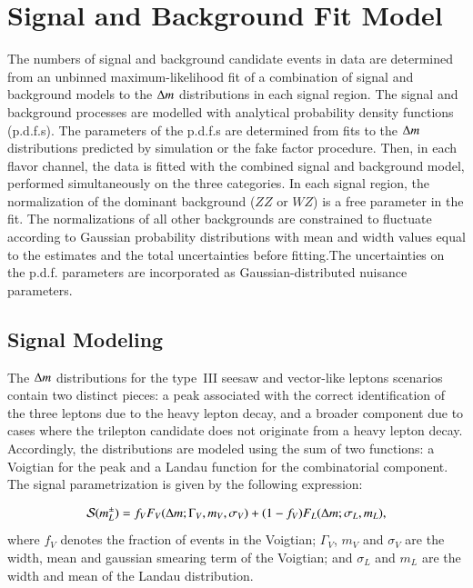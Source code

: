 \section{Signal and Background Fit Model}\label{sec:resonance-fit-method}
The numbers of signal and background candidate events in data are determined from an unbinned maximum-likelihood fit of a combination of signal and background models to the $\Delta m$ distributions in each signal region. The signal and background processes are modelled with analytical probability density functions (p.d.f.s). The parameters of the p.d.f.s are determined from fits to the $\Delta m$ distributions predicted by simulation or the fake factor procedure. Then, in each flavor channel, the data is fitted with the combined signal and background model, performed simultaneously on the three categories. In each signal region, the normalization of the dominant background ($ZZ$ or $WZ$) is a free parameter in the fit. The normalizations of all other backgrounds are constrained to fluctuate according to Gaussian probability distributions with mean and width values equal to the estimates and the total uncertainties before fitting.The uncertainties on the p.d.f. parameters are incorporated as Gaussian-distributed nuisance parameters.

\subsection{Signal Modeling}\label{sec:resonance-signal-model}
The $\Delta m$ distributions for the type~III seesaw and vector-like leptons scenarios contain two distinct pieces: a peak associated with the correct identification of the three leptons due to the heavy lepton decay, and a broader component due to cases where the trilepton candidate does not originate from a heavy lepton decay. Accordingly, the distributions are modeled using the sum of two functions: a Voigtian for the peak and a Landau function for the combinatorial component.  The signal parametrization is given by the following expression: 

\begin{align}\label{eqn:resonance-signal-parametrization}
\mathcal{S}(m_\lpm) &= f_V F_V(\deltam; \Gamma_V, m_V,  \sigma_V ) + (1-f_V)F_L(\deltam; \sigma_L, m_L), \\
\end{align}
where $f_V$ denotes the fraction of events in the Voigtian; $\Gamma_V$, $m_V$ and $\sigma_V$ are the width, mean and gaussian smearing term of the Voigtian; and $\sigma_L$ and $m_L$ are the width and mean of the Landau distribution.  

